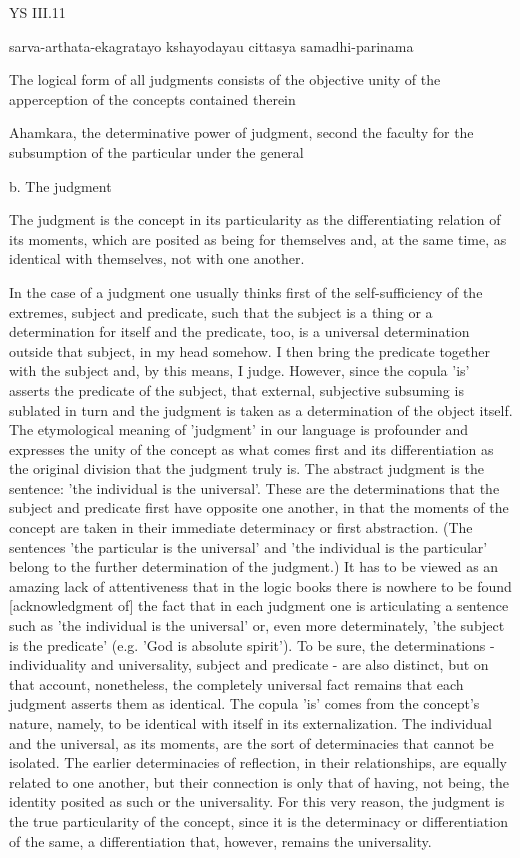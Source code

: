 YS III.11

sarva-arthata-ekagratayo kshayodayau cittasya samadhi-parinama

The logical form of all judgments consists of the objective unity
of the apperception of the concepts contained therein

Ahamkara, the determinative power of judgment,
second the faculty for the subsumption of the particular under the general

b. The judgment

The judgment is the concept in its particularity as the differentiating
relation of its moments, which are posited as being for themselves and,
at the same time, as identical with themselves, not with one another.

    In the case of a judgment one usually thinks first of the self-sufficiency
    of the extremes, subject and predicate, such that the subject is a thing or
    a determination for itself and the predicate, too, is
    a universal determination outside that subject, in my head somehow.
    I then bring the predicate together with the subject and, by this means, I judge.
    However, since the copula 'is' asserts the predicate of the subject,
    that external, subjective subsuming is sublated in turn and
    the judgment is taken as a determination of the object itself.
    The etymological meaning of 'judgment' in our language is
    profounder and expresses the unity of the concept as what comes first and
    its differentiation as the original division that the judgment truly is.
    The abstract judgment is the sentence: 'the individual is the universal'.
    These are the determinations that the subject and predicate
    first have opposite one another, in that the moments of the concept are
    taken in their immediate determinacy or first abstraction.
    (The sentences 'the particular is the universal' and
    'the individual is the particular' belong to
    the further determination of the judgment.)
    It has to be viewed as an amazing lack of attentiveness that
    in the logic books there is nowhere to be found [acknowledgment of]
    the fact that in each judgment one is articulating a sentence such as
    'the individual is the universal' or, even more determinately,
    'the subject is the predicate' (e.g. 'God is absolute spirit').
    To be sure, the determinations - individuality and universality,
    subject and predicate - are also distinct, but on that account,
    nonetheless, the completely universal fact remains that
    each judgment asserts them as identical.
    The copula 'is' comes from the concept's nature, namely,
    to be identical with itself in its externalization.
    The individual and the universal, as its moments, are
    the sort of determinacies that cannot be isolated.
    The earlier determinacies of reflection, in their relationships,
    are equally related to one another, but their connection is only
    that of having, not being, the identity posited as such or the universality.
    For this very reason, the judgment is the true particularity of the concept,
    since it is the determinacy or differentiation of the same,
    a differentiation that, however, remains the universality.

